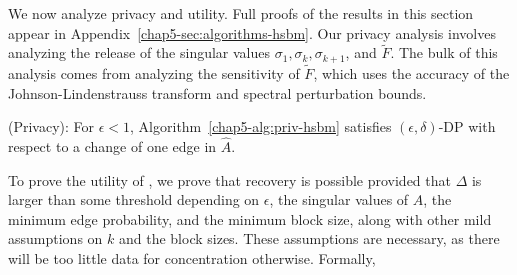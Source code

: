 We now analyze privacy and utility. Full proofs of the results in this section appear in Appendix~\ref{chap5-sec:algorithms-hsbm}.
Our privacy analysis involves analyzing the release of the singular values $\sigma_1, \sigma_k, \sigma_{k+1}$, and $\tilde{F}$. The bulk of this analysis comes from analyzing the sensitivity of $\tilde{F}$, which uses the accuracy of the Johnson-Lindenstrauss transform and spectral perturbation bounds.
\begin{thm}\label{chap5-thm:com-hsbm-priv}
(Privacy): For $\epsilon < 1$, Algorithm~\ref{chap5-alg:priv-hsbm} satisfies $(\epsilon, \delta)$-DP with respect to a change of one edge in $\hat{A}$.
\end{thm}
To prove the utility of \dpcom{}, we prove that recovery is possible provided that $\Delta$ is larger than some threshold depending on $\epsilon$, the singular values of $A$, the minimum edge probability, and the minimum block size, along with other mild assumptions on $k$ and the block sizes. These assumptions are necessary, as there will be too little data for concentration otherwise. Formally,
